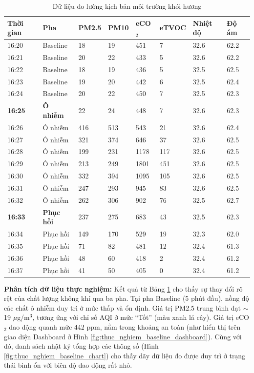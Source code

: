 \documentclass[../DoAn.tex]{subfiles}
\begin{document}
\begin{table}[H]
\centering
\caption{Dữ liệu đo lường kịch bản môi trường khói hương}
\label{table:thuc_nghiem_dot_huong}
\small
\begin{tabularx}{\textwidth}{|X|X|X|X|X|X|X|X|}
\hline
\textbf{Thời gian} & \textbf{Pha} & \textbf{PM2.5} & \textbf{PM10} & \textbf{eCO$_2$} & \textbf{eTVOC} & \textbf{Nhiệt độ} & \textbf{Độ ẩm} \\
\hline
16:20 & Baseline & 18 & 19 & 451 & 7 & 32.6 & 62.2 \\
\hline
16:21 & Baseline & 20 & 22 & 433 & 5 & 32.6 & 62.2 \\
\hline
16:22 & Baseline & 18 & 19 & 436 & 5 & 32.5 & 62.5 \\
\hline
16:23 & Baseline & 19 & 20 & 442 & 6 & 32.5 & 62.4 \\
\hline
16:24 & Baseline & 20 & 22 & 450 & 7 & 32.5 & 62.3 \\
\hline
\textbf{16:25} & \textbf{Ô nhiễm} & 22 & 24 & 448 & 7 & 32.6 & 62.3 \\
\hline
16:26 & Ô nhiễm & 416 & 513 & 543 & 21 & 32.6 & 62.4 \\
\hline
16:27 & Ô nhiễm & 321 & 374 & 646 & 37 & 32.6 & 62.5 \\
\hline
16:28 & Ô nhiễm & 199 & 231 & 1178 & 117 & 32.6 & 62.5 \\
\hline
16:29 & Ô nhiễm & 213 & 249 & 1801 & 451 & 32.6 & 62.5 \\
\hline
16:30 & Ô nhiễm & 332 & 394 & 1095 & 105 & 32.6 & 62.5 \\
\hline
16:31 & Ô nhiễm & 247 & 293 & 945 & 83 & 32.6 & 62.5 \\
\hline
16:32 & Ô nhiễm & 262 & 306 & 902 & 76 & 32.5 & 62.7 \\
\hline
\textbf{16:33} & \textbf{Phục hồi} & 237 & 275 & 683 & 43 & 32.5 & 62.3 \\
\hline
16:34 & Phục hồi & 149 & 170 & 529 & 19 & 32.3 & 62.0 \\
\hline
16:35 & Phục hồi & 71 & 82 & 481 & 12 & 32.4 & 61.3 \\
\hline
16:36 & Phục hồi & 48 & 60 & 418 & 2 & 32.4 & 61.2 \\
\hline
16:37 & Phục hồi & 41 & 50 & 405 & 0 & 32.4 & 61.2 \\
\hline
\end{tabularx}
\end{table}

\textbf{Phân tích dữ liệu thực nghiệm:} Kết quả từ Bảng \ref{table:thuc_nghiem_dot_huong} cho thấy sự thay đổi rõ rệt của chất lượng không khí qua ba pha. Tại pha Baseline (5 phút đầu), nồng độ các chất ô nhiễm duy trì ở mức thấp và ổn định. Giá trị PM2.5 trung bình đạt $\sim$19 $\mu$g/m$^3$, tương ứng với chỉ số AQI ở mức ``Tốt'' (màu xanh lá cây). Giá trị eCO$_2$ dao động quanh mức 442 ppm, nằm trong khoảng an toàn (như hiển thị trên giao diện Dashboard ở Hình \ref{fig:thuc_nghiem_baseline_dashboard}). Cùng với đó, danh sách nhật ký tổng hợp các thông số (Hình \ref{fig:thuc_nghiem_baseline_chart}) cho thấy dãy dữ liệu đo được duy trì ở trạng thái bình ổn với biên độ dao động rất nhỏ.
\end{document}
